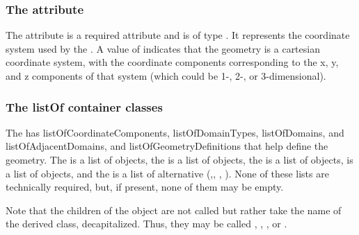 \subsubsection{The  attribute}
The  attribute is a required attribute and is of type . It represents the coordinate system used by the \Geometry.  A value of   indicates that the geometry is a cartesian coordinate system, with the coordinate components corresponding to the x, y, and z components of that system (which could be 1-, 2-, or 3-dimensional).  


\subsubsection{The listOf container classes}
The \Geometry has listOfCoordinateComponents, listOfDomainTypes, listOfDomains, and listOfAdjacentDomains, and listOfGeometryDefinitions that help define the geometry.  The \ListOfCoordinateComponents is a list of \CoordinateComponent objects, the \ListOfDomainTypes is a list of \DomainType objects, the \ListOfDomains is a list of \Domain objects, \ListOfAdjacentDomains is a list of \AdjacentDomains objects, and the \ListOfGeometryDefinitions is a list of alternative \GeometryDefinitions (\ParametricGeometry,\CSGeometry, \SampledFieldGeometry, \AnalyticGeometry).  None of these lists are technically required, but, if present, none of them may be empty.

Note that the children of the \ListOfGeometryDefinitions object are not called  but rather take the name of the derived class, decapitalized.  Thus, they may be called , , , or .


